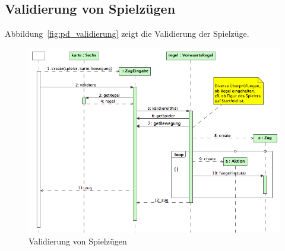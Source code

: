 \documentclass[12pt,halfparskip]{scrartcl}
\begin{document}
\subsection{Validierung von Spielzügen} %
\label{ssub:validierung_von_spielzügen}
Abbildung~\vref{fig:pd_validierung} zeigt die Validierung der Spielzüge.
\begin{figure}[h]
	\centering
	\includegraphics[width=\textwidth]{pd_validierung}
	\caption{Validierung von Spielzügen}
	\label{fig:pd_validierung}
\end{figure}
\end{document}

